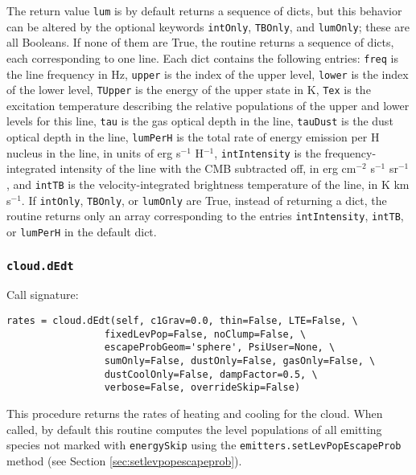 \documentclass[12pt]{article}
\begin{document}
The return value \verb=lum= is by default returns a sequence of dicts, but this behavior can be altered by the optional keywords \verb=intOnly=, \verb=TBOnly=, and \verb=lumOnly=; these are all Booleans. If none of them are True, the routine returns a sequence of dicts, each corresponding to one line. Each dict contains the following entries: \verb=freq= is the line frequency in Hz, \verb=upper= is the index of the upper level, \verb=lower= is the index of the lower level, \verb=TUpper= is the energy of the upper state in K, \verb=Tex= is the excitation temperature describing the relative populations of the upper and lower levels for this line, \verb=tau= is the gas optical depth in the line, \verb=tauDust= is the dust optical depth in the line, \verb=lumPerH= is the total rate of energy emission per H nucleus in the line, in units of erg s$^{-1}$ H$^{-1}$, \verb=intIntensity= is the frequency-integrated intensity of the line with the CMB subtracted off, in erg cm$^{-2}$ s$^{-1}$ sr$^{-1}$, and \verb=intTB= is the velocity-integrated brightness temperature of the line, in K km s$^{-1}$. If \verb=intOnly=, \verb=TBOnly=, or \verb=lumOnly= are True, instead of returning a dict, the routine returns only an array corresponding to the entries \verb=intIntensity=, \verb=intTB=, or \verb=lumPerH= in the default dict.


\subsubsection{\texttt{cloud.dEdt}}
\label{sec:dEdt}

Call signature:

\begin{verbatim}
rates = cloud.dEdt(self, c1Grav=0.0, thin=False, LTE=False, \
                 fixedLevPop=False, noClump=False, \
                 escapeProbGeom='sphere', PsiUser=None, \
                 sumOnly=False, dustOnly=False, gasOnly=False, \
                 dustCoolOnly=False, dampFactor=0.5, \
                 verbose=False, overrideSkip=False)
\end{verbatim}

This procedure returns the rates of heating and cooling for the cloud. When called, by default this routine computes the level populations of all emitting species not marked with \verb=energySkip= using the \verb=emitters.setLevPopEscapeProb= method (see Section \ref{sec:setlevpopescapeprob}).
\end{document}
